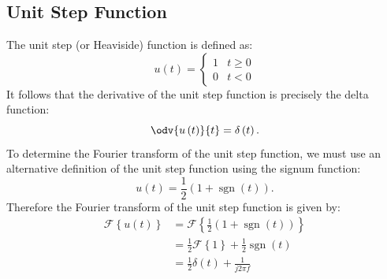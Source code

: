\documentclass{article}
\DeclareMathOperator{\sgn}{sgn}
\begin{document}
\subsection{Unit Step Function}
The unit step (or Heaviside) function is defined as:
\begin{equation*}
    u\left( t \right) =
    \begin{cases}
        1 & t \geq 0 \\
        0 & t < 0
    \end{cases}
\end{equation*}
It follows that the derivative of the unit step function is precisely the delta function:
\begin{equation*}
    \odv{u\left( t \right)}{t} = \delta\left( t \right).
\end{equation*}
To determine the Fourier transform of the unit step function, we must use an alternative definition
of the unit step function using the signum function:
\begin{equation*}
    u\left( t \right) = \frac{1}{2} \left( 1 + \sgn\left( t \right) \right).
\end{equation*}
Therefore the Fourier transform of the unit step function is given by:
\begin{align*}
    \mathscr{F}\left\{ u\left( t \right) \right\} & = \mathscr{F}\left\{ \frac{1}{2} \left( 1 + \sgn\left( t \right) \right) \right\} \\
                                                  & = \frac{1}{2} \mathscr{F}\left\{ 1 \right\} + \frac{1}{2} \sgn\left( t \right)    \\
                                                  & = \frac{1}{2} \delta\left( t \right) + \frac{1}{j 2 \pi f}
\end{align*}
\end{document}
